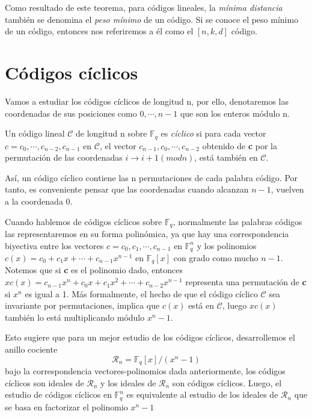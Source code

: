 Como resultado de este teorema, para códigos lineales, la \textit{mínima distancia}  también se denomina el \textit{peso mínimo} de un código. Si se conoce el peso mínimo de un código, entonces nos referiremos a él como el $\left[n,k,d\right]$ código.


\section{Códigos cíclicos}

Vamos a estudiar los códigos cíclicos de longitud n, por ello, denotaremos las coordenadas de sus posiciones como $0,\cdots,n-1$ que son los enteros módulo n.

\begin{definition}
 Un código lineal $\mathcal{C}$ de longitud n sobre $\mathbb{F}_q$ es \textit{cíclico} si para cada vector $c = c_0,\cdots,c_{n-2},c_{n-1}$ en  $\mathcal{C}$, el vector $c_{n-1},c_0,\cdots,c_{n-2}$ obtenido de \textbf{c} por la permutación de las coordenadas $ i \rightarrow i+1 (mod n)$, está también en $\mathcal{C}$.
 \end{definition}
 
 Así, un código cíclico contiene las n permutaciones de cada palabra código. Por tanto, es conveniente pensar que las coordenadas cuando alcanzan $n-1$, vuelven a la coordenada 0.

Cuando hablemos de códigos cíclicos sobre $\mathbb{F}_q$, normalmente las palabras códigos las representaremos en su forma polinómica, ya que hay una correspondencia biyectiva entre los vectores $c = c_0,c_1,\cdots,c_{n-1}$ en $\mathbb{F}_q^n$ y los polinomios $c(x)=c_0+c_1x+\cdots+c_{n-1}x^{n-1}$ en $\mathbb{F}_q[x]$ con grado como mucho $n-1$. Notemos que si \textbf{c} es el polinomio dado, entonces $xc(x)=c_{n-1}x^{n}+c_0x+c_1x^2+\cdots+c_{n-2}x^{n-1}$ representa una permutación de \textbf{c} si $x^n$ es igual a 1. Más formalmente, el hecho de que el código cíclico $\mathcal{C}$ sea invariante por permutaciones, implica que $c(x)$ está en $\mathcal{C}$, luego $xc(x)$ también lo está multiplicando módulo $x^n-1$. 

Esto sugiere que para un mejor estudio de los códigos cíclicos, desarrollemos el anillo cociente \[ \mathcal{R}_n =\mathbb{F}_q[x] / (x^n-1)\]  bajo la correspondencia vectores-polinomios dada anteriormente, los códigos cíclicos son ideales de $\mathcal{R}_n$ y los ideales de $\mathcal{R}_n$ son códigos cíclicos. Luego, el estudio de códigos cíclicos en $\mathbb{F}_q^n$ es equivalente al estudio de los ideales de $\mathcal{R}_n$ que se basa en factorizar el polinomio $x^n-1$


